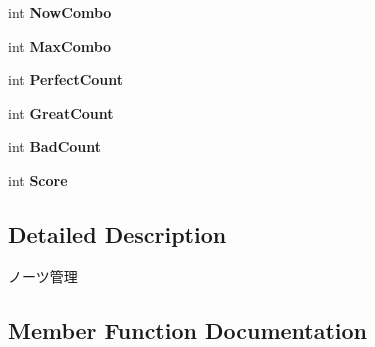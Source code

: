 \begin{DoxyCompactItemize}
\item 
int {\bfseries Now\+Combo}\hypertarget{class_notes_manager_a7cc3afde1accacb888e538cccdf779e7}{}\label{class_notes_manager_a7cc3afde1accacb888e538cccdf779e7}

\item 
int {\bfseries Max\+Combo}\hypertarget{class_notes_manager_a03877900f087cdab1b06a79ea784f470}{}\label{class_notes_manager_a03877900f087cdab1b06a79ea784f470}

\item 
int {\bfseries Perfect\+Count}\hypertarget{class_notes_manager_ab767fa94b954df96b2f7ffa443a3c4b5}{}\label{class_notes_manager_ab767fa94b954df96b2f7ffa443a3c4b5}

\item 
int {\bfseries Great\+Count}\hypertarget{class_notes_manager_a80c613c1930742c45a71ebff81d4faf8}{}\label{class_notes_manager_a80c613c1930742c45a71ebff81d4faf8}

\item 
int {\bfseries Bad\+Count}\hypertarget{class_notes_manager_aa89e9356b38044f776adfa30f3e7ee42}{}\label{class_notes_manager_aa89e9356b38044f776adfa30f3e7ee42}

\item 
int {\bfseries Score}\hypertarget{class_notes_manager_a72d130f7996ccc91f828b4af01fef1f3}{}\label{class_notes_manager_a72d130f7996ccc91f828b4af01fef1f3}

\end{DoxyCompactItemize}


\subsection{Detailed Description}
ノーツ管理 



\subsection{Member Function Documentation}
